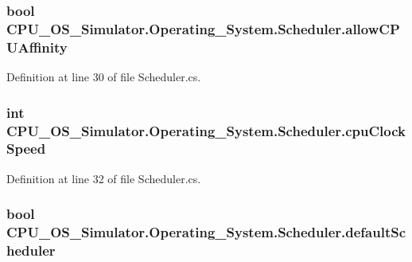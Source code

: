 \subsubsection[{allow\+C\+P\+U\+Affinity}]{\setlength{\rightskip}{0pt plus 5cm}bool C\+P\+U\+\_\+\+O\+S\+\_\+\+Simulator.\+Operating\+\_\+\+System.\+Scheduler.\+allow\+C\+P\+U\+Affinity\hspace{0.3cm}{\ttfamily [private]}}\label{class_c_p_u___o_s___simulator_1_1_operating___system_1_1_scheduler_a732d4b0d95cad3e280f9b69dd4f9f7c4}


Definition at line 30 of file Scheduler.\+cs.

\hypertarget{class_c_p_u___o_s___simulator_1_1_operating___system_1_1_scheduler_ae1829f5340f76cad2150c9e1f9ab3c69}{}
\subsubsection[{cpu\+Clock\+Speed}]{\setlength{\rightskip}{0pt plus 5cm}int C\+P\+U\+\_\+\+O\+S\+\_\+\+Simulator.\+Operating\+\_\+\+System.\+Scheduler.\+cpu\+Clock\+Speed\hspace{0.3cm}{\ttfamily [private]}}\label{class_c_p_u___o_s___simulator_1_1_operating___system_1_1_scheduler_ae1829f5340f76cad2150c9e1f9ab3c69}


Definition at line 32 of file Scheduler.\+cs.

\hypertarget{class_c_p_u___o_s___simulator_1_1_operating___system_1_1_scheduler_afe8019eea4f52f2bd30c40c0ae576eac}{}
\subsubsection[{default\+Scheduler}]{\setlength{\rightskip}{0pt plus 5cm}bool C\+P\+U\+\_\+\+O\+S\+\_\+\+Simulator.\+Operating\+\_\+\+System.\+Scheduler.\+default\+Scheduler\hspace{0.3cm}{\ttfamily [private]}}\label{class_c_p_u___o_s___simulator_1_1_operating___system_1_1_scheduler_afe8019eea4f52f2bd30c40c0ae576eac}


